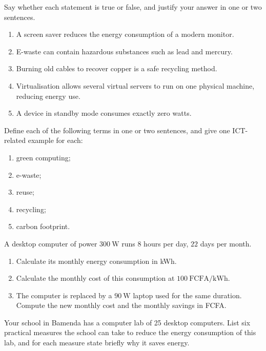 \documentclass[11pt]{article}
\newcounter{popsec}
\newcounter{popsub}
\newcommand{\courssub}[1]{%
  \stepcounter{popsub}%
  \par\vspace{9pt}\noindent{\popxbold\fontsize{11.5}{13}\selectfont\color{popink}{\color{poporange}\thepopsec.\thepopsub}\hspace{6pt}#1}\par\nopagebreak\vspace{4pt}
}
\begin{document}
\begin{exercice}
Say whether each statement is true or false, and justify your answer in one or two sentences.
\begin{enumerate}
\item A screen saver reduces the energy consumption of a modern monitor.
\item E-waste can contain hazardous substances such as lead and mercury.
\item Burning old cables to recover copper is a safe recycling method.
\item Virtualisation allows several virtual servers to run on one physical machine, reducing energy use.
\item A device in standby mode consumes exactly zero watts.
\end{enumerate}
\end{exercice}

\begin{exercice}
Define each of the following terms in one or two sentences, and give one ICT-related example for each:
\begin{enumerate}
\item green computing;
\item e-waste;
\item reuse;
\item recycling;
\item carbon footprint.
\end{enumerate}
\end{exercice}

\begin{exercice}
A desktop computer of power $300\ \mathrm{W}$ runs $8$ hours per day, $22$ days per month.
\begin{enumerate}
\item Calculate its monthly energy consumption in kWh.
\item Calculate the monthly cost of this consumption at $100\ \mathrm{FCFA/kWh}$.
\item The computer is replaced by a $90\ \mathrm{W}$ laptop used for the same duration. Compute the new monthly cost and the monthly savings in FCFA.
\end{enumerate}
\end{exercice}

\courssub{I practise}

\begin{exercice}
Your school in Bamenda has a computer lab of 25 desktop computers. List six practical measures the school can take to reduce the energy consumption of this lab, and for each measure state briefly why it saves energy.
\end{exercice}
\end{document}
